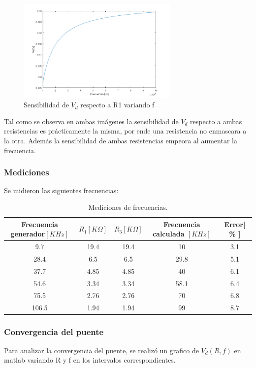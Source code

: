 \documentclass[../../main.tex]{subfiles}
\begin{document}
\begin{figure}[H]	
	\centering
	\includegraphics[width=0.7\textwidth]{fotos/r1f.png}
	\caption{Sensibilidad de $V_d$ respecto a R1 variando f}
\end{figure}


Tal como se observa en ambas im\'agenes la sensibilidad de $V_d$ respecto a ambas resistencias es pr\'acticamente la misma, por ende una resistencia no enmascara a la otra. Adem\'as la sensibilidad de ambas resistencias empeora al aumentar la frecuencia.




\subsubsection{Mediciones}
Se midieron las siguientes frecuencias:

\begin{table}[H]
\begin{center}
\begin{tabular}{|c|c|c|c|c|}
\hline
Frecuencia generador$[KHz]$& $R_1 [K\Omega]$ & $R_3[K\Omega]$ & Frecuencia calculada $[KHz]$ &Error[ \% ]\\
\hline \hline
9.7 & 19.4& 19.4&10&3.1  \\ \hline
28.4 & 6.5& 6.5&29.8&5.1  \\ \hline
37.7 & 4.85& 4.85&40&6.1  \\ \hline
54.6 & 3.34& 3.34&58.1&6.4  \\ \hline
75.5 & 2.76& 2.76&70&6.8  \\ \hline
106.5 & 1.94& 1.94&99&8.7  \\ \hline

\end{tabular}
\caption{Mediciones de frecuencias.} 
\end{center}
\end{table}

\subsubsection{Convergencia del puente}
Para analizar la convergencia del puente, se realizó un grafico de $V_d(R,f)$ en matlab variando R y f en los intervalos correspondientes.
\end{document}
